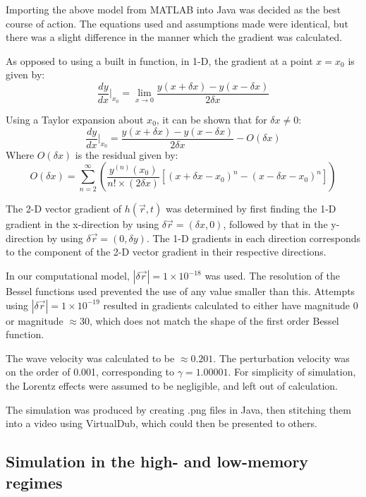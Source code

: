 Importing the above model from MATLAB into Java was decided as the best course of action. The equations used and assumptions made were identical, but there was a slight difference in the manner which the gradient was calculated.

As opposed to using a built in function, in 1-D, the gradient at a point $x = x_0$ is given by:
\begin{equation} \frac{dy}{dx}\Bigr|_{x_0} = \lim_{x\to0} \frac{y(x+\delta x)-y(x-\delta x)}{2\delta x}\end{equation}

Using a Taylor expansion about $x_0$, it can be shown that for $\delta x\neq 0$:
\begin{equation} \frac{dy}{dx}\Bigr|_{x_0} = \frac{y(x+\delta x) - y(x-\delta x)}{2\delta x} - O(\delta x)\end{equation}
Where $O(\delta x)$ is the residual given by:
\begin{equation}O(\delta x) = \sum_{n=2}^{\infty} \left( \frac{y^{(n)}(x_0)}{n!\times (2\delta x)} \left[ \left( x+\delta x -x_0 \right)^n - \left(x-\delta x -x_0 \right)^n \right] \right)\end{equation}

The 2-D vector gradient of $h(\vec{r} , t)$ was determined by first finding the 1-D gradient in the x-direction by using $\delta \vec{r} = (\delta x,0)$, followed by that in the y-direction by using $\delta \vec{r} = (0,\delta y)$. The 1-D gradients in each direction corresponds to the component of the 2-D vector gradient in their respective directions. 

In our computational model, $|\delta \vec{r}| = 1\times 10^{-18}$ was used. The resolution of the Bessel functions used prevented the use of any value smaller than this. Attempts using $|\delta \vec{r}| = 1\times 10^{-19}$ resulted in gradients calculated to either have magnitude 0 or magnitude $\approx 30$, which does not match the shape of the first order Bessel function.

The wave velocity was calculated to be $\approx 0.201$. The perturbation velocity was on the order of 0.001, corresponding to $\gamma = 1.00001$. For simplicity of simulation, the Lorentz effects were assumed to be negligible, and left out of calculation.

The simulation was produced by creating .png files in Java, then stitching them into a video using VirtualDub, which could then be presented to others.

\subsection{Simulation in the high- and low-memory regimes}

